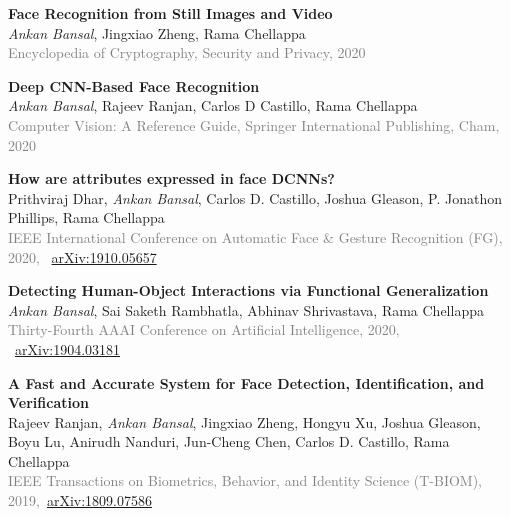 \documentclass[11pt, a4paper]{article}
\begin{document}
\vspace{4pt}

\textbf{Face Recognition from Still Images and Video}\\
\textit{Ankan Bansal}, Jingxiao Zheng, Rama Chellappa\\
\textcolor{gray}{Encyclopedia of Cryptography, Security and Privacy, 2020}

\vspace{4pt}

\textbf{Deep CNN-Based Face Recognition}\\
\textit{Ankan Bansal}, Rajeev Ranjan, Carlos D Castillo, Rama Chellappa\\
\textcolor{gray}{Computer Vision: A Reference Guide, Springer International Publishing, Cham, 2020}

\vspace{4pt}

\textbf{How are attributes expressed in face DCNNs?}\\
Prithviraj Dhar, \textit{Ankan Bansal}, Carlos D. Castillo, Joshua Gleason, P. Jonathon Phillips, Rama Chellappa\\
\textcolor{gray}{IEEE International Conference on Automatic Face \& Gesture Recognition (FG), 2020,} ~\href{https://arxiv.org/abs/1910.05657}{arXiv:1910.05657}

\vspace{4pt}

\textbf{Detecting Human-Object Interactions via Functional Generalization}\\
\textit{Ankan Bansal}, Sai Saketh Rambhatla, Abhinav Shrivastava, Rama Chellappa\\
\textcolor{gray}{Thirty-Fourth AAAI Conference on Artificial Intelligence, 2020,} ~\href{https://arxiv.org/abs/1904.03181}{arXiv:1904.03181}

\vspace{4pt}

\textbf{A Fast and Accurate System for Face Detection, Identification, and Verification} \\
Rajeev Ranjan, \textit{Ankan Bansal}, Jingxiao Zheng, Hongyu Xu, Joshua Gleason, Boyu Lu, Anirudh
Nanduri, Jun-Cheng Chen, Carlos D. Castillo, Rama Chellappa\\
\textcolor{gray}{IEEE Transactions on Biometrics, Behavior, and Identity Science (T-BIOM), 2019,}~\href{https://arxiv.org/abs/1809.07586}{arXiv:1809.07586}

\vspace{4pt}
\end{document}
